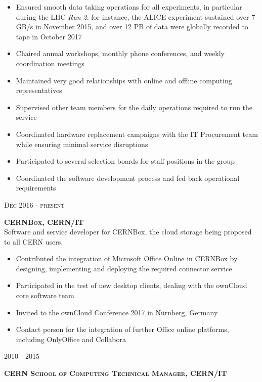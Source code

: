 \documentclass[11pt]{article}
\renewcommand{\subsection}[2]%
        {
         {\bf{\raggedright \scshape #1}}{\bf{\hfill \scshape #2}}\\[-.7\baselineskip]
}
\newenvironment{CompactItemize} {
  \begin{itemize}
  \setlength{\itemsep}{-3pt}
  \setlength{\parsep}{0pt}
  \setlength{\topsep}{-2pt}
  \setlength{\partopsep}{-2pt}
} {\end{itemize}}
\begin{document}
\begin{CompactItemize}
\item Ensured smooth data taking operations for all experiments, in particular during the LHC \emph{Run 2}: for instance, the ALICE experiment sustained over 7 GB/s in November 2015, and over 12 PB of data were globally recorded to tape in October 2017
\item Chaired annual workshops, monthly phone conferences, and weekly coordination meetings
\item Maintained very good relationships with online and offline computing representatives
\item Supervised other team members for the daily operations required to run the service
\item Coordinated hardware replacement campaigns with the IT Procurement team while ensuring minimal service disruptions
\item Participated to several selection boards for staff positions in the group
\item Coordinated the software development process and fed back operational requirements
\end{CompactItemize}

\subsection{Dec 2016 - present}{CERNBox, CERN/IT}

Software and service developer for CERNBox, the cloud storage being proposed to all CERN users.

\begin{CompactItemize}
\item Contributed the integration of Microsoft Office Online in CERNBox by designing, implementing and deploying the required connector service
\item Participated in the test of new desktop clients, dealing with the ownCloud core software team
\item Invited to the ownCloud Conference 2017 in N{\"u}rnberg, Germany
\item Contact person for the integration of further Office online platforms, including OnlyOffice and Collabora
\end{CompactItemize}

\subsection{2010 - 2015}{CERN School of Computing Technical Manager, CERN/IT}
\end{document}
